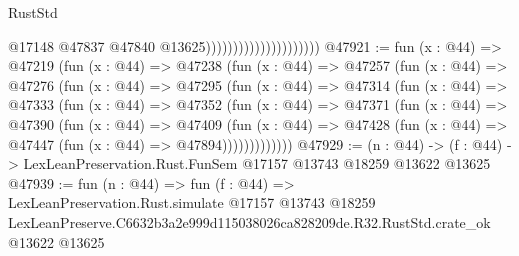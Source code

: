 \begin{lexlean}{RustStd}
\begin{coremodule}
                                              @17148
                                              @47837
                                              @47840
                                              @13625)))))))))))))))))))))
@47921 := fun (x : @44) =>
  @47219
    (fun (x : @44) =>
    @47238
      (fun (x : @44) =>
      @47257
        (fun (x : @44) =>
        @47276
          (fun (x : @44) =>
          @47295
            (fun (x : @44) =>
            @47314
              (fun (x : @44) =>
              @47333
                (fun (x : @44) =>
                @47352
                  (fun (x : @44) =>
                  @47371
                    (fun (x : @44) =>
                    @47390
                      (fun (x : @44) =>
                      @47409
                        (fun (x : @44) =>
                        @47428 (fun (x : @44) => @47447 (fun (x : @44) => @47894)))))))))))))
@47929 := (n : @44) ->
  (f : @44) -> LexLeanPreservation.Rust.FunSem @17157 @13743 @18259 @13622 @13625
@47939 := fun (n : @44) =>
  fun (f : @44) =>
  LexLeanPreservation.Rust.simulate
    @17157
    @13743
    @18259
    LexLeanPreserve.C6632b3a2e999d115038026ca828209de.R32.RustStd.crate_ok
    @13622
    @13625
\end{coremodule}
\end{lexlean}
